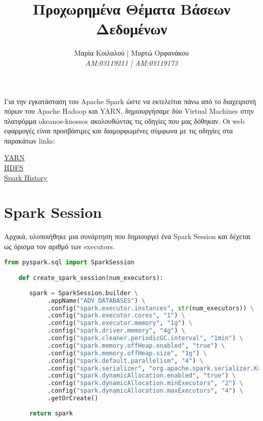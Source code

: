 \documentclass{article}
\title{Προχωρημένα Θέματα Βάσεων Δεδομένων}
\author{Μαρία Κοιλαλού | Μυρτώ Ορφανάκου\\
\textit{AM:03119211 | ΑM:03119173}}
\begin{document}
\maketitle

\vspace{3\baselineskip}

\section{}
Για την εγκατάσταση του Apache Spark ώστε να εκτελείται πάνω από το διαχειριστή πόρων του Apache Hadoop και YARN,
δημιουργήσαμε δύο Virtual Machines στην πλατφόρμα okeanos-knossos ακολουθώντας τις οδηγίες που μας δόθηκαν.
Οι web εφαρμογές είναι προσβάσιμες και διαμορφωμένες σύμφωνα με τις οδηγίες στα παρακάτων links: 

\begin{center}
\href{http://83.212.81.191:8088}{YARN} \\
\href{http://83.212.81.191:9870}{HDFS} \\
\href{http://83.212.81.191:18080}{Spark History} \\
\end{center}


\section*{Spark Session}

Αρχικά, υλοποιήθηκε μια συνάρτηση που δημιουργεί ένα Spark Session και δέχεται ως όρισμα τον αριθμό των executors.

\begin{lstlisting}[language = Python]
    from pyspark.sql import SparkSession

    def create_spark_session(num_executors):
       
       spark = SparkSession.builder \
            .appName("ADV DATABASES") \
            .config("spark.executor.instances", str(num_executors)) \
            .config("spark.executor.cores", "1") \
            .config("spark.executor.memory", "1g") \
            .config("spark.driver.memory", "4g") \
            .config("spark.cleaner.periodicGC.interval", "1min") \
            .config("spark.memory.offHeap.enabled", "true") \
            .config("spark.memory.offHeap.size", "1g") \
            .config("spark.default.parallelism", "4") \
            .config("spark.serializer", "org.apache.spark.serializer.KryoSerializer") \
            .config("spark.dynamicAllocation.enabled", "true") \
            .config("spark.dynamicAllocation.minExecutors", "2") \
            .config("spark.dynamicAllocation.maxExecutors", "4") \
            .getOrCreate()
          
       return spark
\end{lstlisting}
\end{document}
